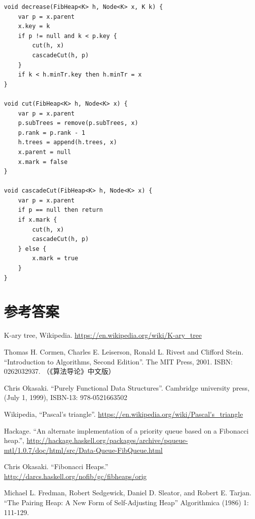 \documentclass[b5paper]{ctexart}
\begin{document}
\begin{lstlisting}[language = Bourbaki]
void decrease(FibHeap<K> h, Node<K> x, K k) {
    var p = x.parent
    x.key = k
    if p != null and k < p.key {
        cut(h, x)
        cascadeCut(h, p)
    }
    if k < h.minTr.key then h.minTr = x
}

void cut(FibHeap<K> h, Node<K> x) {
    var p = x.parent
    p.subTrees = remove(p.subTrees, x)
    p.rank = p.rank - 1
    h.trees = append(h.trees, x)
    x.parent = null
    x.mark = false
}

void cascadeCut(FibHeap<K> h, Node<K> x) {
    var p = x.parent
    if p == null then return
    if x.mark {
        cut(h, x)
        cascadeCut(h, p)
    } else {
        x.mark = true
    }
}
\end{lstlisting}

\ifx\wholebook\relax \else
\section{参考答案}
\shipoutAnswer

\begin{thebibliography}{99}

K-ary tree, Wikipedia. \url{https://en.wikipedia.org/wiki/K-ary_tree}

Thomas H. Cormen, Charles E. Leiserson, Ronald L. Rivest and Clifford Stein. ``Introduction to Algorithms, Second Edition''. The MIT Press, 2001. ISBN: 0262032937. （《算法导论》中文版）

Chris Okasaki. ``Purely Functional Data Structures''. Cambridge university press, (July 1, 1999), ISBN-13: 978-0521663502

Wikipedia, ``Pascal's triangle''. \url{https://en.wikipedia.org/wiki/Pascal's_triangle}

Hackage. ``An alternate implementation of a priority queue based on a Fibonacci heap.'', \url{http://hackage.haskell.org/packages/archive/pqueue-mtl/1.0.7/doc/html/src/Data-Queue-FibQueue.html}

Chris Okasaki. ``Fibonacci Heaps.'' \url{http://darcs.haskell.org/nofib/gc/fibheaps/orig}

Michael L. Fredman, Robert Sedgewick, Daniel D. Sleator, and Robert E. Tarjan. ``The Pairing Heap: A New Form of Self-Adjusting Heap'' Algorithmica (1986) 1: 111-129.

\end{thebibliography}

\expandafter\enddocument
\fi
\end{document}
